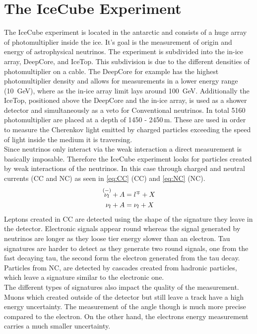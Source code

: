 \section{The IceCube Experiment}
\label{sec:The_IceCube_Experiment}
The IceCube experiment is located in the antarctic and consists of a huge array of photomultiplier inside the ice. 
It's goal is the measurement of origin and energy of astrophysical neutrinos.
The experiment is subdivided into the in-ice array, DeepCore, and IceTop. 
This subdivision is due to the different densities of photomultiplier on a cable. 
The DeepCore for example has the highest photomultiplier density and allows for measurements in a lower energy 
range (\qty{10}{\giga\eV}), where as the in-ice array limit lays around \qty{100}{\giga\eV}.
Additionally the IceTop, positioned above the DeepCore and the in-ice array, 
is used as a shower detector and simultaneously as a veto for Conventional neutrinos.
In total 5160 photomultiplier are placed at a depth of 1450 - 2450\,\unit{\meter}. 
These are used in order to measure the Cherenkov light emitted by charged particles exceeding the speed of light inside the medium it is traversing. \\

Since neutrinos only interact via the weak interaction a direct measurement is basically imposable. 
Therefore the IceCube experiment looks for particles created by weak interactions of the neutrinos. 
In this case through charged and neutral currents (CC and NC) as seen in \autoref{eq:CC} (CC) and \autoref{eq:NC} (NC).
\begin{align}
	\overset{(-)}{\nu_l} + A &= l^\mp + X \label{eq:CC}\\
	\nu_l + A &= \nu_l + X \label{eq:NC}	
\end{align}
Leptons created in CC are detected using the shape of the signature they leave in the detector. 
Electronic signals appear round whereas the signal generated by neutrinos 
are longer as they loose tier energy slower than an electron. 
Tau signatures are harder to detect as they generate two round signals, 
one from the fast decaying tau, the second form the electron generated from the tau decay.
Particles from NC, are detected by cascades created from hadronic particles, 
which leave a signature similar to the electronic one.\\

The different types of signatures also impact the quality of the measurement. Muons which created outside of the detector but still leave a track have a high energy uncertainty. The measurement of the angle though is much more precise compared to the electron. On the other hand, the electrons energy measurement carries a much smaller uncertainty.\\

